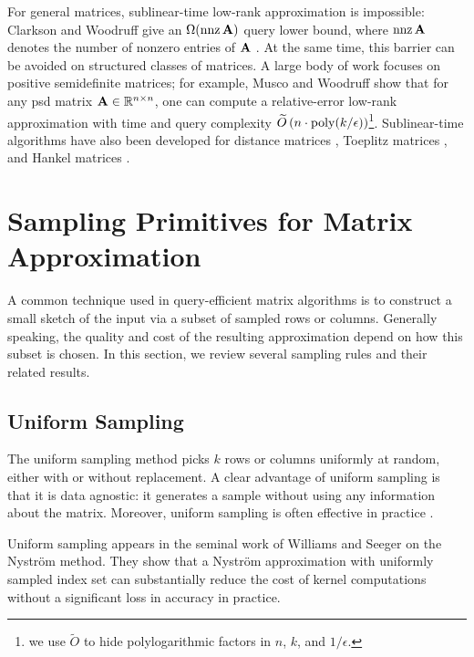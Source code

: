 For general matrices, sublinear-time low-rank approximation is impossible: Clarkson and Woodruff give an $\Omega(\operatorname*{nnz}\mathbf{A})$ query lower bound, where $\operatorname*{nnz}\mathbf{A}$ denotes the number of nonzero entries of $\mathbf{A}$ \cite{clarkson_low_2013}. At the same time, this barrier can be avoided on structured classes of matrices. A large body of work focuses on positive semidefinite matrices; for example, Musco and Woodruff show that for any psd matrix $\mathbf{A}\in\mathbb{R}^{n\times n}$, one can compute a relative-error low-rank approximation with time and query complexity $\widetilde O\left(n\cdot \operatorname*{poly}(k/\epsilon)\right)$\footnote{we use $\widetilde O$ to hide polylogarithmic factors in $n$, $k$, and $1/\epsilon$.}. Sublinear-time algorithms have also been developed for distance matrices \cite{bakshi_sublinear_2018}, Toeplitz matrices \cite{musco_sublinear_2024}, and Hankel matrices \cite{kapralov_sublinear_2025}.


\section{Sampling Primitives for Matrix Approximation}
A common technique used in query-efficient matrix algorithms is to construct a small sketch of the input via a subset of sampled rows or columns. Generally speaking, the quality and cost of the resulting approximation depend on how this subset is chosen. In this section, we review several sampling rules and their related results.

\subsection{Uniform Sampling}
The uniform sampling method picks $k$ rows or columns uniformly at random, either with or without replacement. A clear advantage of uniform sampling is that it is data agnostic: it generates a sample without using any information about the matrix. Moreover, uniform sampling is often effective in practice \cite{kumar_sampling_2012, gittens_revisiting_2013}.

Uniform sampling appears in the seminal work of Williams and Seeger \cite{williams_using_2000} on the Nystr\"om method. They show that a Nystr\"om approximation with uniformly sampled index set can substantially reduce the cost of kernel computations without a significant loss in accuracy in practice. 

